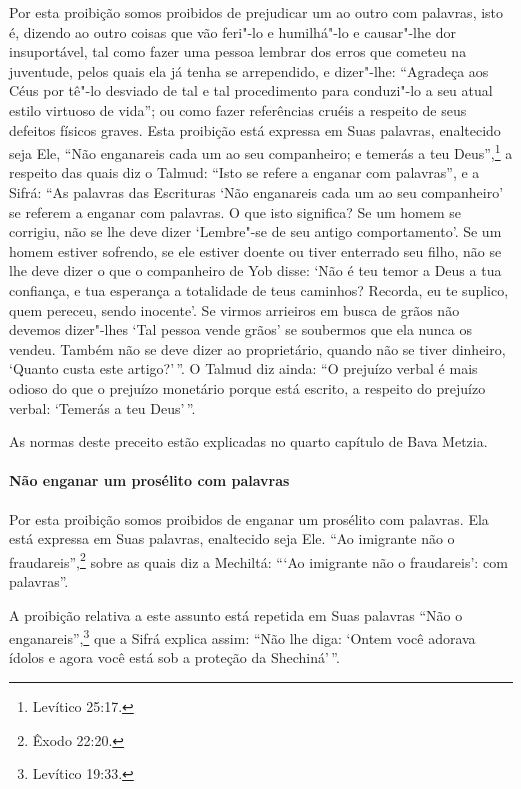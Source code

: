 \begin{multicols}{2}
Por esta proibição somos proibidos de prejudicar um ao outro com
palavras, isto é, dizendo ao outro coisas que vão feri"-lo e humilhá"-lo e
causar"-lhe dor insuportável, tal como fazer uma pessoa lembrar dos erros
que cometeu na juventude, pelos quais ela já tenha se arrependido, e
dizer"-lhe: ``Agradeça aos Céus por tê"-lo desviado de tal e tal
procedimento para conduzi"-lo a seu atual estilo virtuoso de vida''; ou
como fazer referências cruéis a respeito de seus defeitos físicos
graves. Esta proibição está expressa em Suas palavras, enaltecido seja
Ele, ``Não enganareis cada um ao seu companheiro; e temerás a teu Deus'',\footnote{Levítico 25:17.} a respeito das quais diz o Talmud\starr: ``Isto se refere a
enganar com palavras'', e a Sifrá\starr: ``As palavras das Escrituras `Não
enganareis cada um ao seu companheiro' se referem a enganar com
palavras. O que isto significa? Se um homem se corrigiu, não se lhe
deve dizer `Lembre"-se de seu antigo comportamento'. Se um homem estiver
sofrendo, se ele estiver doente ou tiver enterrado seu filho, não se
lhe deve dizer o que o companheiro de Yob disse: `Não é teu temor a Deus
a tua confiança, e tua esperança a totalidade de teus caminhos? Recorda,
eu te suplico, quem pereceu, sendo inocente'. Se virmos arrieiros em
busca de grãos não devemos dizer"-lhes `Tal pessoa vende grãos' se
soubermos que ela nunca os vendeu. Também não se deve dizer ao
proprietário, quando não se tiver dinheiro, `Quanto custa este
artigo?'\,''. O Talmud\starr{} diz ainda: ``O prejuízo verbal é mais odioso do que
o prejuízo monetário porque está escrito, a respeito do prejuízo
verbal: `Temerás a teu Deus'\,''.

As normas deste preceito estão explicadas no quarto capítulo de Bava Metzia\starr.

\paragraph{Não enganar um prosélito com palavras}

Por esta proibição somos proibidos de enganar um prosélito com palavras.
Ela está expressa em Suas palavras, enaltecido seja Ele. ``Ao imigrante
não o fraudareis'',\footnote{Êxodo 22:20.} sobre as quais diz a Mechiltá\starr: ```Ao
imigrante não o fraudareis': com palavras''.

A proibição relativa a este assunto está repetida em Suas palavras ``Não
o enganareis'',\footnote{Levítico 19:33.} que a Sifrá\starr{} explica assim: ``Não lhe
diga: `Ontem você adorava ídolos e agora você está sob a proteção da
Shechiná\starr'\,''.


\end{multicols}
